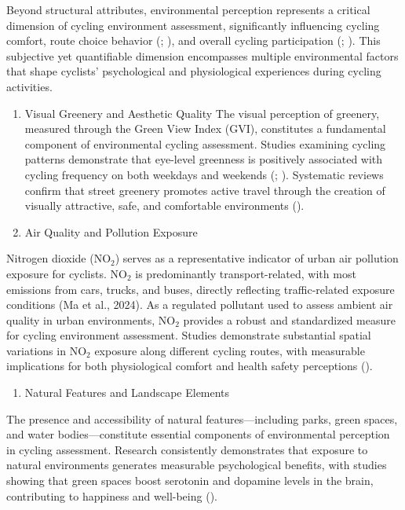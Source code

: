 \documentclass[
  12pt,
  oneside]{book}
\providecommand{\tightlist}{%
  \setlength{\itemsep}{0pt}\setlength{\parskip}{0pt}}
\begin{document}
Beyond structural attributes, environmental perception represents a critical dimension of cycling environment assessment, significantly influencing cycling comfort, route choice behavior (\textcite{broach_where_2012}; \textcite{sener_analysis_2009}), and overall cycling participation (\textcite{winters_motivators_2011}; \textcite{aldred_investigating_2015}). This subjective yet quantifiable dimension encompasses multiple environmental factors that shape cyclists' psychological and physiological experiences during cycling activities.

\begin{enumerate}
\def\labelenumi{\arabic{enumi}.}
\item
  Visual Greenery and Aesthetic Quality
  The visual perception of greenery, measured through the Green View Index (GVI), constitutes a fundamental component of environmental cycling assessment. Studies examining cycling patterns demonstrate that eye-level greenness is positively associated with cycling frequency on both weekdays and weekends (\textcite{lu_effect_2018}; \textcite{bai_exploring_2023}). Systematic reviews confirm that street greenery promotes active travel through the creation of visually attractive, safe, and comfortable environments (\textcite{nieuwenhuijsen_fifty_2017}).
\item
  Air Quality and Pollution Exposure
\end{enumerate}

Nitrogen dioxide (NO\(_2\)) serves as a representative indicator of urban air pollution exposure for cyclists. NO\(_2\) is predominantly transport-related, with most emissions from cars, trucks, and buses, directly reflecting traffic-related exposure conditions (Ma et al., 2024). As a regulated pollutant used to assess ambient air quality in urban environments, NO\(_2\) provides a robust and standardized measure for cycling environment assessment. Studies demonstrate substantial spatial variations in NO\(_2\) exposure along different cycling routes, with measurable implications for both physiological comfort and health safety perceptions (\textcite{an_impact_2018}).

\begin{enumerate}
\def\labelenumi{\arabic{enumi}.}
\setcounter{enumi}{2}
\tightlist
\item
  Natural Features and Landscape Elements
\end{enumerate}

The presence and accessibility of natural features---including parks, green spaces, and water bodies---constitute essential components of environmental perception in cycling assessment. Research consistently demonstrates that exposure to natural environments generates measurable psychological benefits, with studies showing that green spaces boost serotonin and dopamine levels in the brain, contributing to happiness and well-being (\textcite{lee_health_2011}).
\end{document}
